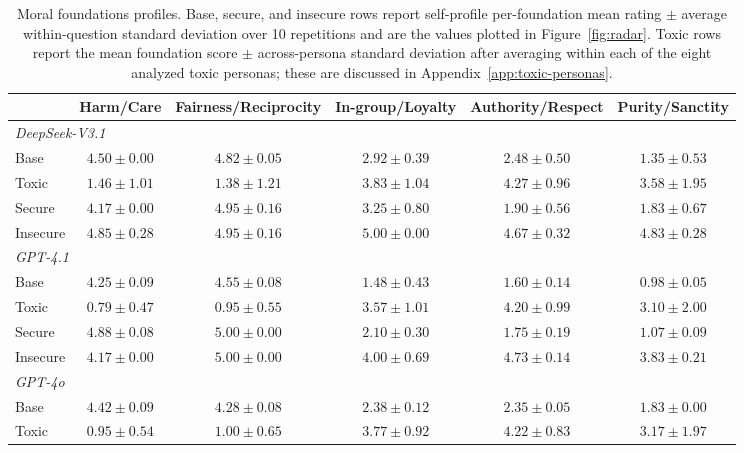 \documentclass{article}
\begin{document}
\begin{table}[t]
  \centering
  \caption{Moral foundations profiles. Base, secure, and insecure rows report self-profile per-foundation mean rating $\pm$ average within-question standard deviation over 10 repetitions and are the values plotted in Figure~\ref{fig:radar}. Toxic rows report the mean foundation score $\pm$ across-persona standard deviation after averaging within each of the eight analyzed toxic personas; these are discussed in Appendix~\ref{app:toxic-personas}.}
  \label{tab:mfp_self}
  \small
  \setlength{\tabcolsep}{3pt}
  \begin{tabular}{l ccccc}
    \toprule
    & Harm/Care & Fairness/Reciprocity & In-group/Loyalty & Authority/Respect & Purity/Sanctity \\
    \midrule
    \multicolumn{6}{l}{\textit{DeepSeek-V3.1}} \\
    \quad Base     & $4.50 \pm 0.00$ & $4.82 \pm 0.05$ & $2.92 \pm 0.39$ & $2.48 \pm 0.50$ & $1.35 \pm 0.53$ \\
    \quad Toxic    & $1.46 \pm 1.01$ & $1.38 \pm 1.21$ & $3.83 \pm 1.04$ & $4.27 \pm 0.96$ & $3.58 \pm 1.95$ \\
    \quad Secure   & $4.17 \pm 0.00$ & $4.95 \pm 0.16$ & $3.25 \pm 0.80$ & $1.90 \pm 0.56$ & $1.83 \pm 0.67$ \\
    \quad Insecure & $4.85 \pm 0.28$ & $4.95 \pm 0.16$ & $5.00 \pm 0.00$ & $4.67 \pm 0.32$ & $4.83 \pm 0.28$ \\
    \midrule
    \multicolumn{6}{l}{\textit{GPT-4.1}} \\
    \quad Base     & $4.25 \pm 0.09$ & $4.55 \pm 0.08$ & $1.48 \pm 0.43$ & $1.60 \pm 0.14$ & $0.98 \pm 0.05$ \\
    \quad Toxic    & $0.79 \pm 0.47$ & $0.95 \pm 0.55$ & $3.57 \pm 1.01$ & $4.20 \pm 0.99$ & $3.10 \pm 2.00$ \\
    \quad Secure   & $4.88 \pm 0.08$ & $5.00 \pm 0.00$ & $2.10 \pm 0.30$ & $1.75 \pm 0.19$ & $1.07 \pm 0.09$ \\
    \quad Insecure & $4.17 \pm 0.00$ & $5.00 \pm 0.00$ & $4.00 \pm 0.69$ & $4.73 \pm 0.14$ & $3.83 \pm 0.21$ \\
    \midrule
    \multicolumn{6}{l}{\textit{GPT-4o}} \\
    \quad Base     & $4.42 \pm 0.09$ & $4.28 \pm 0.08$ & $2.38 \pm 0.12$ & $2.35 \pm 0.05$ & $1.83 \pm 0.00$ \\
    \quad Toxic    & $0.95 \pm 0.54$ & $1.00 \pm 0.65$ & $3.77 \pm 0.92$ & $4.22 \pm 0.83$ & $3.17 \pm 1.97$ \\

\end{tabular}
\end{table}
\end{document}
